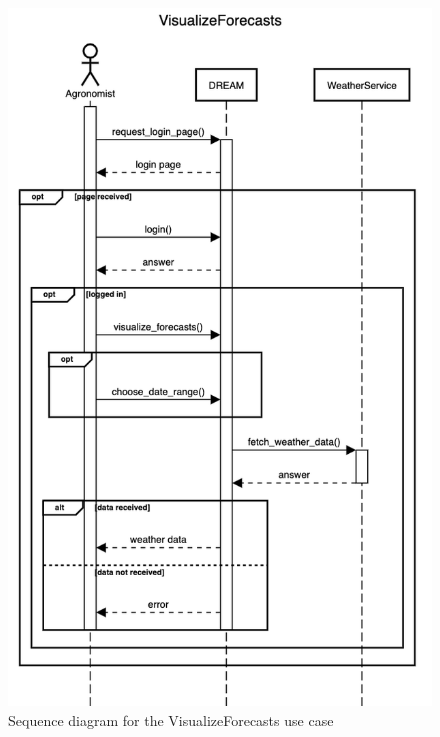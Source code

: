 \documentclass{article}
\begin{document}
\begin{figure}[H]
    \centering
	\includegraphics[scale=0.5]{sequence_diagrams/VisualizeForecasts}
    \caption{Sequence diagram for the VisualizeForecasts use case}
\end{figure}
\end{document}
